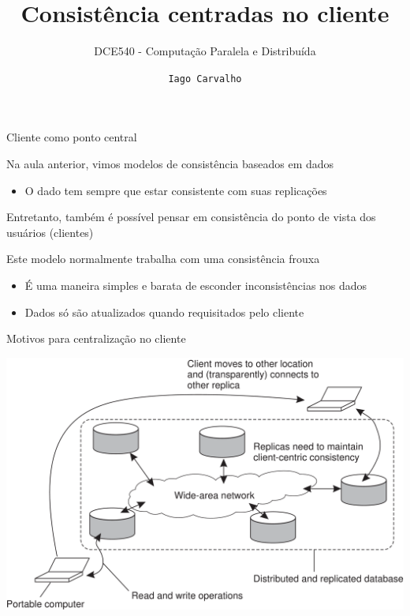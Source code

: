 \documentclass[compress]{beamer}
\title{Consistência centradas no cliente}
\subtitle{DCE540 - Computação Paralela e Distribuída}
\author{\texttt{Iago Carvalho}}
\institute{\texttt{Departamento de Ciência da Computação}}
\begin{document}
\begin{frame}
\titlepage

\end{frame}


\begin{frame}{Cliente como ponto central}

Na aula anterior, vimos modelos de consistência baseados em dados
\begin{itemize}
    \item O dado tem sempre que estar consistente com suas replicações
\end{itemize}

\vspace{0.5cm}

Entretanto, também é possível pensar em consistência do ponto de vista dos usuários (clientes)

\vspace{0.5cm}

Este modelo normalmente trabalha com uma consistência frouxa
\begin{itemize}
    \item É uma maneira simples e barata de esconder inconsistências nos dados
    \item Dados só são atualizados quando requisitados pelo cliente
\end{itemize}
\end{frame}


\begin{frame}{Motivos para centralização no cliente}

\centering \includegraphics[width=\textwidth]{images/joaozinho.png}

\end{frame}
\end{document}
